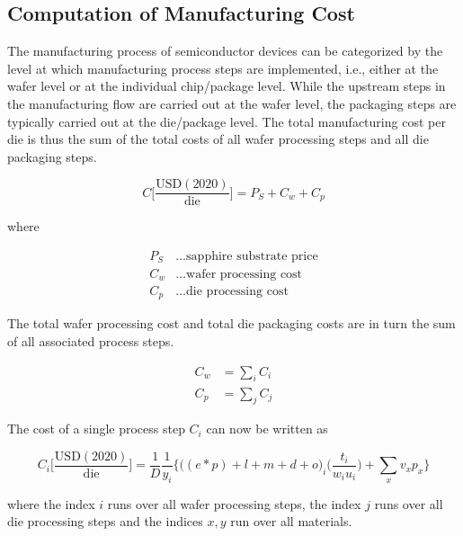 \documentclass[10pt]{article}
\begin{document}
\subsection{Computation of Manufacturing Cost}

The manufacturing process of semiconductor devices can be categorized by the level at which manufacturing process steps are implemented, i.e., either at the wafer level or at the individual chip/package level. While the upstream steps in the manufacturing flow are carried out at the wafer level, the packaging steps are typically carried out at the die/package level. The total manufacturing cost per die is thus the sum of the total costs of all wafer processing steps and all die packaging steps.

\begin{equation}
\label{eqn:cost_sum}
    C \bigg[ \frac{ \text{USD}(2020) }{ \text{die} } \bigg] = P_S + C_w + C_p
\end{equation}

where

\begin{align*}
    P_S &\dots \text{sapphire substrate price} \\
    C_w &\dots \text{wafer processing cost} \\
    C_p &\dots \text{die processing cost}
\end{align*}

The total wafer processing cost and total die packaging costs are in turn the sum of all associated process steps.

\begin{align}
	C_w &= \sum_i C_i \\
	C_p &= \sum_j C_j
\end{align}

The cost of a single process step $C_i$ can now be written as

\begin{equation}
\label{eqn:cost_wafer}
    C_i \bigg[ \frac{ \text{USD}(2020) }{ \text{die} } \bigg] =\frac{1}{D}  \frac{1}{y_i}   \bigg\{ \bigg((e*p) + l + m + d +o \bigg)_i \bigg( \frac{t_i}{w_i u_i} \bigg) + \sum_{x} v_x p_x \bigg\}
\end{equation}

where the index $i$ runs over all wafer processing steps, the index $j$ runs over all die processing steps and the indices $x,y$ run over all materials.
\end{document}
